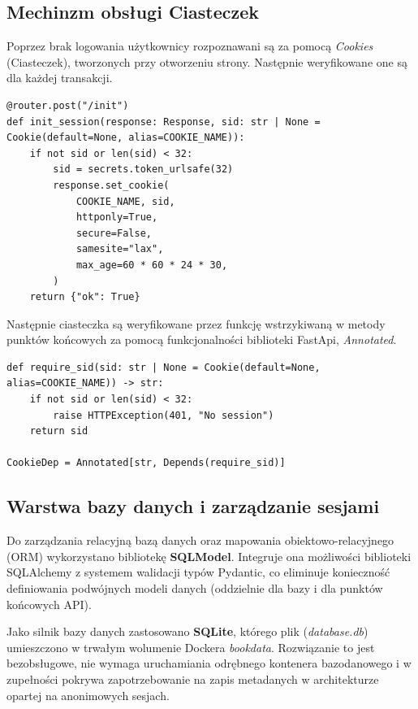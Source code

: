 \subsection{Mechinzm obsługi Ciasteczek}
Poprzez brak logowania użytkownicy rozpoznawani są za pomocą \textit{Cookies} (Ciasteczek),
tworzonych przy otworzeniu strony. Następnie weryfikowane one są dla każdej transakcji.
\begin{lstlisting}[style=pythonStyle, label={lst:cookies_init}, caption={
    Tworzenie ciasteczek dla przeglądarki po uruchomieniu strony.
}]
@router.post("/init")
def init_session(response: Response, sid: str | None = Cookie(default=None, alias=COOKIE_NAME)):
    if not sid or len(sid) < 32:
        sid = secrets.token_urlsafe(32)
        response.set_cookie(
            COOKIE_NAME, sid,
            httponly=True,
            secure=False,
            samesite="lax",
            max_age=60 * 60 * 24 * 30,
        )
    return {"ok": True}
\end{lstlisting}
Następnie ciasteczka są weryfikowane przez funkcję wstrzykiwaną w metody punktów końcowych za 
pomocą funkcjonalności biblioteki FastApi, \textit{Annotated}.
\begin{lstlisting}[style=pythonStyle, label={lst:cookie_check}, caption={
    Funkcja sprawdzająca nagłówek.
}]
def require_sid(sid: str | None = Cookie(default=None, alias=COOKIE_NAME)) -> str:
    if not sid or len(sid) < 32:
        raise HTTPException(401, "No session")
    return sid

CookieDep = Annotated[str, Depends(require_sid)]
\end{lstlisting}

\subsection{Warstwa bazy danych i zarządzanie sesjami}
Do zarządzania relacyjną bazą danych oraz mapowania obiektowo-relacyjnego (ORM) wykorzystano bibliotekę \textbf{SQLModel}. Integruje ona możliwości biblioteki SQLAlchemy z systemem
walidacji typów Pydantic, co eliminuje konieczność definiowania podwójnych modeli danych (oddzielnie dla bazy i dla punktów końcowych API).

Jako silnik bazy danych zastosowano \textbf{SQLite}, którego plik (\textit{database.db}) umieszczono w trwałym wolumenie Dockera \textit{bookdata}. Rozwiązanie to jest bezobsługowe,
nie wymaga uruchamiania odrębnego kontenera bazodanowego i w zupełności pokrywa zapotrzebowanie na zapis metadanych w architekturze opartej na anonimowych sesjach.

